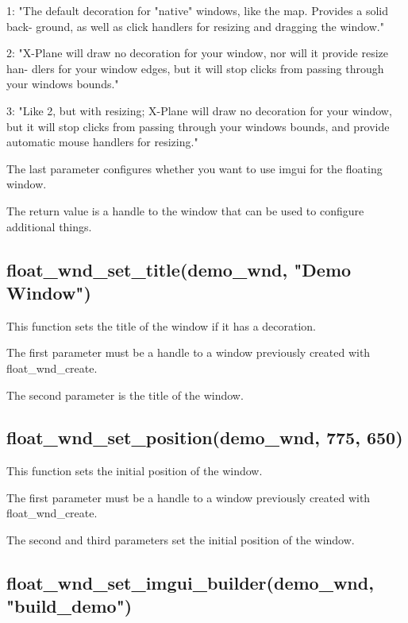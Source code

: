 \documentclass[11pt,parskip=half,a4paper]{scrartcl}
\begin{document}
\hspace*{10mm}	1: "The default decoration for "native" windows, like the map. Provides a solid back-
\hspace*{10mm}	ground, as well as click handlers for resizing and dragging the window."

\hspace*{10mm}	2: "X-Plane will draw no decoration for your window, nor will it provide resize han-
\hspace*{10mm}	dlers for your window edges, but it will stop clicks from passing through your windows
\hspace*{10mm}	bounds."

\hspace*{10mm}	3: "Like 2, but with resizing; X-Plane will draw no decoration for your window, but
\hspace*{10mm}	it will stop clicks from passing through your windows bounds, and provide automatic
\hspace*{10mm}	mouse handlers for resizing."

The last parameter configures whether you want to use imgui for the floating window.

The return value is a handle to the window that can be used to configure additional things.

\subsection{float\_wnd\_set\_title(demo\_wnd, "Demo Window")}

This function sets the title of the window if it has a decoration.

The first parameter must be a handle to a window previously created with float\_wnd\_create.

The second parameter is the title of the window.

\subsection{float\_wnd\_set\_position(demo\_wnd, 775, 650)}

This function sets the initial position of the window.

The first parameter must be a handle to a window previously created with float\_wnd\_create.

The second and third parameters set the initial position of the window.

\subsection{float\_wnd\_set\_imgui\_builder(demo\_wnd, "build\_demo")}
\end{document}
